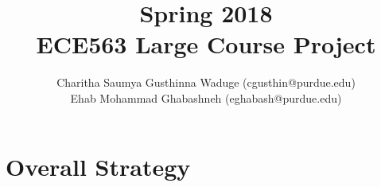 \documentclass[12pt]{article}
\title{Spring 2018\\  ECE563 Large Course Project}
\author{Charitha Saumya Gusthinna Waduge (cgusthin@purdue.edu) \\ Ehab Mohammad Ghabashneh (eghabash@purdue.edu)}
\begin{document}
\maketitle
\section{Overall Strategy}




\end{document}
